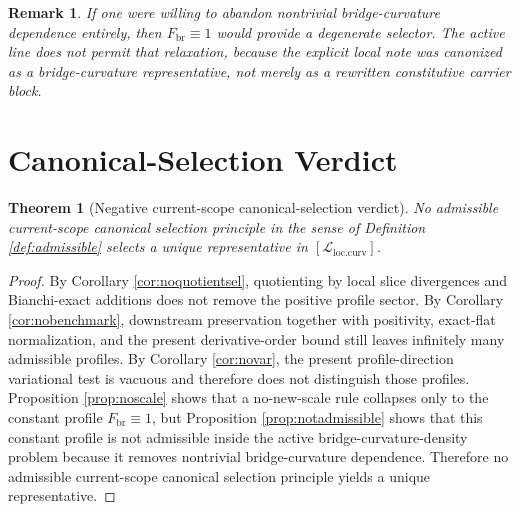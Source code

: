 \documentclass[11pt]{article}
\newcommand{\CurvProfile}{F_{\mathrm{br}}}
\newcommand{\CurvQuot}{[\mathcal L_{\mathrm{loc.curv}}]}
\newtheorem{remark}{Remark}
\newtheorem{theorem}{Theorem}
\begin{document}
\begin{remark}
If one were willing to abandon nontrivial bridge-curvature dependence entirely, then \(\CurvProfile\equiv1\) would provide a degenerate selector. The active line does not permit that relaxation, because the explicit local note was canonized as a bridge-curvature representative, not merely as a rewritten constitutive carrier block.
\end{remark}

\section{Canonical-Selection Verdict}

\begin{theorem}[Negative current-scope canonical-selection verdict]
\label{thm:negative}
No admissible current-scope canonical selection principle in the sense of Definition \ref{def:admissible} selects a unique representative in \(\CurvQuot\).
\end{theorem}

\begin{proof}
By Corollary \ref{cor:noquotientsel}, quotienting by local slice divergences and Bianchi-exact additions does not remove the positive profile sector. By Corollary \ref{cor:nobenchmark}, downstream preservation together with positivity, exact-flat normalization, and the present derivative-order bound still leaves infinitely many admissible profiles. By Corollary \ref{cor:novar}, the present profile-direction variational test is vacuous and therefore does not distinguish those profiles. Proposition \ref{prop:noscale} shows that a no-new-scale rule collapses only to the constant profile \(\CurvProfile\equiv1\), but Proposition \ref{prop:notadmissible} shows that this constant profile is not admissible inside the active bridge-curvature-density problem because it removes nontrivial bridge-curvature dependence. Therefore no admissible current-scope canonical selection principle yields a unique representative.
\end{proof}
\end{document}
